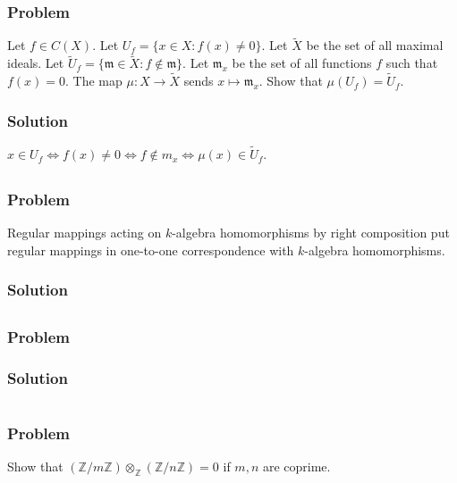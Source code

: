 \documentclass[book,12pt,oneside,openany]{memoir}
\begin{document}
\subsection{Problem}
Let $f\in C(X)$.
Let $U_f=\{x\in X:f(x)\ne 0\}$.
Let $\tilde{X}$ be the set of all maximal ideals.
Let $\tilde{U}_f=\{\mathfrak m\in\tilde{X}:f\notin\mathfrak m\}$.
Let $\mathfrak m_x$ be the set of all functions $f$ such that $f(x)=0$.
The map $\mu:X\to\tilde{X}$ sends $x\mapsto\mathfrak m_x$.
Show that $\mu(U_f)=\tilde{U}_f$.
\subsection{Solution}
$x\in U_f\iff f(x)\ne0\iff f\notin m_x\iff \mu(x)\in\tilde{U}_f$.
\section{}
\subsection{Problem}
Regular mappings acting on $k$-algebra homomorphisms by right composition
put regular mappings in one-to-one correspondence with $k$-algebra
homomorphisms.
\subsection{Solution}
\section{}
\subsection{Problem}
\subsection{Solution}


\chapter{}

\section{}
\subsection{Problem}
Show that $\left( \mathbb{Z}/m\mathbb{Z} \right) \otimes_{\mathbb{Z}}  \left( \mathbb{Z}/n\mathbb{Z} \right) = 0$ if $m,n$ are coprime.
\end{document}
